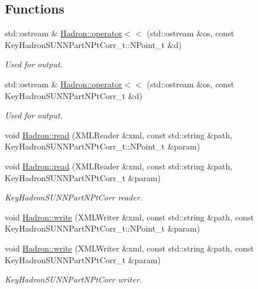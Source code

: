 \subsection*{Functions}
\begin{DoxyCompactItemize}
\item 
std\+::ostream \& \mbox{\hyperlink{namespaceHadron_a2559588d0550564638289369a0d3ba30}{Hadron\+::operator$<$$<$}} (std\+::ostream \&os, const Key\+Hadron\+S\+U\+N\+N\+Part\+N\+Pt\+Corr\+\_\+t\+::\+N\+Point\+\_\+t \&d)
\begin{DoxyCompactList}\small\item\em Used for output. \end{DoxyCompactList}\item 
std\+::ostream \& \mbox{\hyperlink{namespaceHadron_af2ff7a4948a4b5cdeaabc1de5072918c}{Hadron\+::operator$<$$<$}} (std\+::ostream \&os, const Key\+Hadron\+S\+U\+N\+N\+Part\+N\+Pt\+Corr\+\_\+t \&d)
\begin{DoxyCompactList}\small\item\em Used for output. \end{DoxyCompactList}\item 
void \mbox{\hyperlink{namespaceHadron_aaef0a2bed7d8dd73e0611d46f68b4ee6}{Hadron\+::read}} (X\+M\+L\+Reader \&xml, const std\+::string \&path, Key\+Hadron\+S\+U\+N\+N\+Part\+N\+Pt\+Corr\+\_\+t\+::\+N\+Point\+\_\+t \&param)
\item 
void \mbox{\hyperlink{namespaceHadron_a921e2dea91400934dabd596c18164033}{Hadron\+::read}} (X\+M\+L\+Reader \&xml, const std\+::string \&path, Key\+Hadron\+S\+U\+N\+N\+Part\+N\+Pt\+Corr\+\_\+t \&param)
\begin{DoxyCompactList}\small\item\em Key\+Hadron\+S\+U\+N\+N\+Part\+N\+Pt\+Corr reader. \end{DoxyCompactList}\item 
void \mbox{\hyperlink{namespaceHadron_a5dd8ceac99cd9e526324bf30fca8e225}{Hadron\+::write}} (X\+M\+L\+Writer \&xml, const std\+::string \&path, const Key\+Hadron\+S\+U\+N\+N\+Part\+N\+Pt\+Corr\+\_\+t\+::\+N\+Point\+\_\+t \&param)
\item 
void \mbox{\hyperlink{namespaceHadron_abf12b2168d7e3741fcc320bf4b8c53df}{Hadron\+::write}} (X\+M\+L\+Writer \&xml, const std\+::string \&path, const Key\+Hadron\+S\+U\+N\+N\+Part\+N\+Pt\+Corr\+\_\+t \&param)
\begin{DoxyCompactList}\small\item\em Key\+Hadron\+S\+U\+N\+N\+Part\+N\+Pt\+Corr writer. \end{DoxyCompactList}\item 

\end{DoxyCompactItemize}
